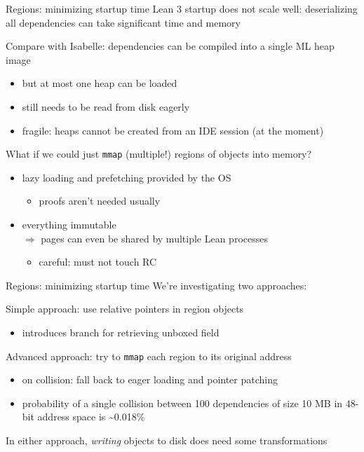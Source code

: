 \documentclass[t]{beamer}
\newcommand{\kit}[1]{\textcolor{KITgreen}{#1}}
\begin{document}
\begin{frame}[fragile]{Regions: minimizing startup time}
Lean 3 startup does not scale well: deserializing all dependencies can take significant time and memory

\pause
\vfill

Compare with Isabelle: dependencies can be compiled into a single ML heap image
\pause
\begin{itemize}
\item<+-> but at most one heap can be loaded
\item<+-> still needs to be read from disk eagerly
\item<5-> fragile: heaps cannot be created from an IDE session (at the moment)
\end{itemize}

\pause
\vfill

What if we could just \verb!mmap! (multiple!) regions of objects into memory?
\pause
\begin{itemize}
\item<+-> lazy loading and prefetching provided by the OS
  \begin{itemize}
  \item proofs aren't needed usually
  \end{itemize}
\item<+-> everything immutable \\
  $\Longrightarrow$ pages can even be shared by multiple Lean processes
  \begin{itemize}
  \item careful: must not touch RC
  \end{itemize}
\end{itemize}
\end{frame}

\begin{frame}{Regions: minimizing startup time}
We're investigating two approaches:

\bigskip

\kit{Simple approach:} use relative pointers in region objects
\begin{itemize}
\item introduces branch for retrieving unboxed field
\end{itemize}

\pause
\bigskip

  \kit{Advanced approach:} try to \texttt{mmap} each region to its original address
\begin{itemize}
\item on collision: fall back to eager loading and pointer patching
\item probability of a single collision between 100 dependencies of size
  10 MB in 48-bit address space is \textasciitilde0.018\%
\end{itemize}

\pause
\bigskip

In either approach, \emph{writing} objects to disk \kit{does} need some transformations
\end{frame}
\end{document}
